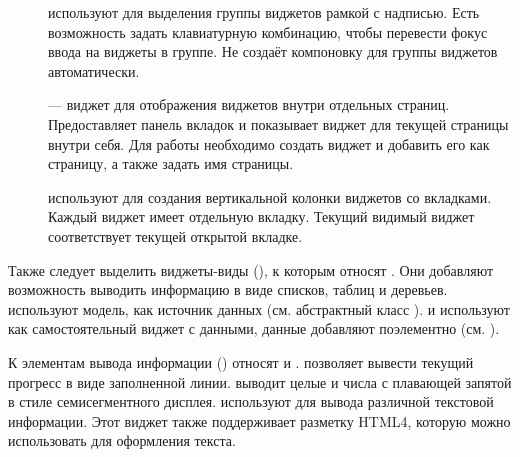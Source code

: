\begin{description}
\item[] используют для выделения группы виджетов рамкой с надписью. Есть возможность задать
клавиатурную комбинацию, чтобы перевести фокус ввода на виджеты в группе. Не создаёт компоновку для группы виджетов
автоматически.
\item[] --- виджет для отображения виджетов внутри отдельных страниц. Предоставляет панель
вкладок и показывает виджет для текущей страницы внутри себя. Для работы необходимо создать виджет и добавить его как
страницу, а также задать имя страницы.
\item[] используют для создания вертикальной колонки виджетов со вкладками. Каждый виджет имеет
отдельную вкладку. Текущий видимый виджет соответствует текущей открытой вкладке. 
\end{description}

Также следует выделить виджеты-виды (), к которым относят .
 Они добавляют возможность выводить информацию в виде
списков, таблиц и деревьев.   используют модель, 
как источник данных (см. абстрактный
класс  ).   и   
используют как самостоятельный виджет с данными,
данные добавляют поэлементно (см.  ). 

К элементам вывода информации () относят
 и .
 позволяет вывести текущий
прогресс в виде заполненной линии. 
выводит целые и числа с плавающей запятой в стиле семисегментного дисплея.
 используют для вывода различной текстовой
информации. Этот виджет также поддерживает разметку HTML4, которую можно использовать для оформления текста.

